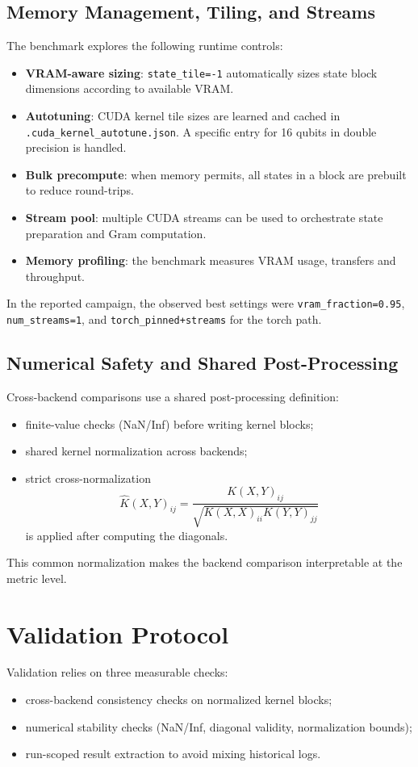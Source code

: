 \documentclass[10pt,twocolumn,letterpaper]{article}
\begin{document}
\subsection{Memory Management, Tiling, and Streams}
The benchmark explores the following runtime controls:
\begin{itemize}
    \item \textbf{VRAM-aware sizing}: \texttt{state\_tile=-1} automatically sizes state block dimensions according to available VRAM.
    \item \textbf{Autotuning}: CUDA kernel tile sizes are learned and cached in \texttt{.cuda\_kernel\_autotune.json}. A specific entry for 16 qubits in double precision is handled.
    \item \textbf{Bulk precompute}: when memory permits, all states in a block are prebuilt to reduce round-trips.
    \item \textbf{Stream pool}: multiple CUDA streams can be used to orchestrate state preparation and Gram computation.
    \item \textbf{Memory profiling}: the benchmark measures VRAM usage, transfers and throughput.
\end{itemize}

In the reported campaign, the observed best settings were \texttt{vram\_fraction=0.95}, \texttt{num\_streams=1}, and \texttt{torch\_pinned+streams} for the torch path.

\subsection{Numerical Safety and Shared Post-Processing}
Cross-backend comparisons use a shared post-processing definition:
\begin{itemize}
    \item finite-value checks (NaN/Inf) before writing kernel blocks;
    \item shared kernel normalization across backends;
    \item strict cross-normalization
    \[
    \hat K(X,Y)_{ij} = \frac{K(X,Y)_{ij}}{\sqrt{K(X,X)_{ii}K(Y,Y)_{jj}}}
    \]
    is applied after computing the diagonals.
\end{itemize}

This common normalization makes the backend comparison interpretable at the metric level.

\section{Validation Protocol}
Validation relies on three measurable checks:
\begin{itemize}
    \item cross-backend consistency checks on normalized kernel blocks;
    \item numerical stability checks (NaN/Inf, diagonal validity, normalization bounds);
    \item run-scoped result extraction to avoid mixing historical logs.
\end{itemize}
\end{document}
